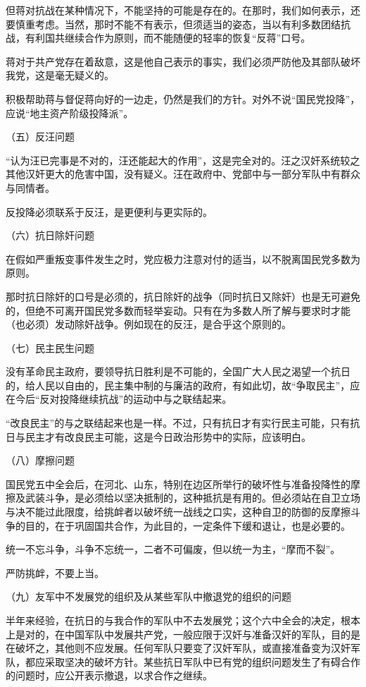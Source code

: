但蒋对抗战在某种情况下，不能坚持的可能是存在的。在那时，我们如何表示，还要慎重考虑。当然，那时不能不有表示，但须适当的姿态，当以有利多数团结抗战，有利国共继续合作为原则，而不能随便的轻率的恢复“反蒋”口号。

蒋对于共产党存在着敌意，这是他自己表示的事实，我们必须严防他及其部队破坏我党，这是毫无疑义的。

积极帮助蒋与督促蒋向好的一边走，仍然是我们的方针。对外不说“国民党投降”，应说“地主资产阶级投降派”。

（五）反汪问题

“认为汪已完事是不对的，汪还能起大的作用”，这是完全对的。汪之汉奸系统较之其他汉奸更大的危害中国，没有疑义。汪在政府中、党部中与一部分军队中有群众与同情者。

反投降必须联系于反汪，是更便利与更实际的。


（六）抗日除奸问题

在假如严重叛变事件发生之时，党应极力注意对付的适当，以不脱离国民党多数为原则。

那时抗日除奸的口号是必须的，抗日除奸的战争（同时抗日又除奸）也是无可避免的，但绝不可离开国民党多数而轻举妄动。只有在为多数人所了解与要求时才能（也必须）发动除奸战争。例如现在的反汪，是合乎这个原则的。

（七）民主民生问题

没有革命民主政府，要领导抗日胜利是不可能的，全国广大人民之渴望一个抗日的，给人民以自由的，民主集中制的与廉洁的政府，有如此切，故“争取民主”，应在今后“反对投降继续抗战”的运动中与之联结起来。

“改良民主”的与之联结起来也是一样。不过，只有抗日才有实行民主可能，只有抗日与民主才有改良民主可能，这是今日政治形势中的实际，应该明白。

（八）摩擦问题

国民党五中全会后，在河北、山东，特别在边区所举行的破坏性与准备投降性的摩擦及武装斗争，是必须给以坚决抵制的，这种抵抗是有用的。但必须站在自卫立场与决不能过此限度，给挑衅者以破坏统一战线之口实，这种自卫的防御的反摩擦斗争的目的，在于巩固国共合作，为此目的，一定条件下缓和退让，也是必要的。

统一不忘斗争，斗争不忘统一，二者不可偏废，但以统一为主，“摩而不裂”。

严防挑衅，不要上当。

（九）友军中不发展党的组织及从某些军队中撤退党的组织的问题

半年来经验，在抗日的与我合作的军队中不去发展党；这个六中全会的决定，根本上是对的，在中国军队中发展共产党，一般应限于汉奸与准备汉奸的军队，目的是在破坏之，其他则不应发展。任何军队只要变了汉奸军队，或直接准备变为汉奸军队，都应采取坚决的破坏方针。某些抗日军队中已有党的组织问题发生了有碍合作的问题时，应公开表示撤退，以求合作之继续。

